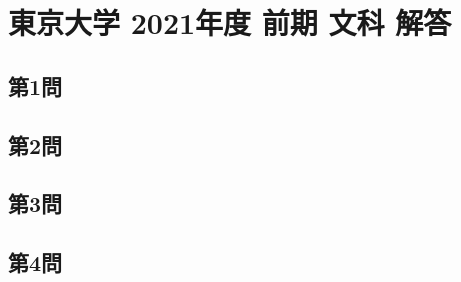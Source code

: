 ﻿\documentclass[../../uem_tok_a.tex]{subfiles}
\begin{document}
    \section{東京大学 2021年度 前期 文科 解答}

    \subsection{第1問}
    

    \clearpage
    \subsection{第2問}
    

    \clearpage
    \subsection{第3問}
    

    \clearpage
    \subsection{第4問}
    

    \clearpage
\end{document}
